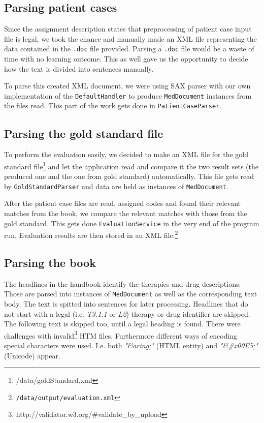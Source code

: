 \documentclass{article}
\begin{document}
\subsection{Parsing patient cases}

Since the assignment description states that preprocessing of patient case input file is legal, we took the chance and manually made an XML file representing the data contained in the \texttt{.doc} file provided. Parsing a \texttt{.doc} file would be a waste of time with no learning outcome. This as well gave us the opportunity to decide how the text is divided into sentences manually.

To parse this created XML document, we were using SAX parser with our own implementation of the \texttt{DefaultHandler} to produce \texttt{MedDocument} instances from the files read. This part of the work gets done in \texttt{PatientCaseParser}.

\subsection{Parsing the gold standard file}

To perform the evaluation easily, we decided to make an XML file for the gold standard file\footnote{/data/goldStandard.xml} and let the application read and compare it the two result sets (the produced one and the one from gold standard) automatically. This file gets read by \texttt{GoldStandardParser} and data are held as instances of \texttt{MedDocument}.

After the patient case files are read, assigned codes and found their relevant matches from the book, we compare the relevant matches with those from the gold standard. This gets done \texttt{EvaluationService} in the very end of the program run. Evaluation results are then stored in an XML file.\footnote{\texttt{/data/output/evaluation.xml}}

\subsection{Parsing the book}

The headlines in the handbook identify the therapies and drug descriptions. Those are parsed into instances of \texttt{MedDocument} as well as the corresponding text body. The text is spitted into sentences for later processing. Headlines that do not start with a legal (i.e. \textit{T3.1.1} or \textit{L2}) therapy or drug identifier are skipped. The following text is skipped too, until a legal heading is found.
There were challenges with invalid\footnote{http://validator.w3.org/\#validate\_by\_upload} HTM files. Furthermore different ways of encoding special characters were used. I.e. both \textit{"\&aring;"} (HTML entity) and \textit{"\&#x00E5;"} (Unicode) appear.
\end{document}
